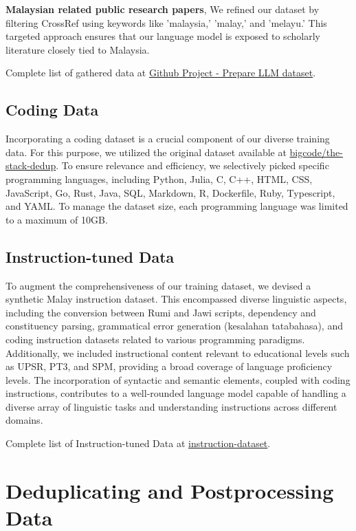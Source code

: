 \documentclass{article}
\begin{document}
\textbf{Malaysian related public research papers}, We refined our dataset by filtering CrossRef using keywords like 'malaysia,' 'malay,' and 'melayu.' This targeted approach ensures that our language model is exposed to scholarly literature closely tied to Malaysia.

Complete list of gathered data at \href{https://github.com/users/huseinzol05/projects/1}{Github Project - Prepare LLM dataset}.

\subsection{Coding Data}

Incorporating a coding dataset is a crucial component of our diverse training data. For this purpose, we utilized the original dataset available at \href{https://huggingface.co/datasets/bigcode/the-stack-dedup}{bigcode/the-stack-dedup}. To ensure relevance and efficiency, we selectively picked specific programming languages, including Python, Julia, C, C++, HTML, CSS, JavaScript, Go, Rust, Java, SQL, Markdown, R, Dockerfile, Ruby, Typescript, and YAML. To manage the dataset size, each programming language was limited to a maximum of 10GB.

\subsection{Instruction-tuned Data}

To augment the comprehensiveness of our training dataset, we devised a synthetic Malay instruction dataset. This encompassed diverse linguistic aspects, including the conversion between Rumi and Jawi scripts, dependency and constituency parsing, grammatical error generation (kesalahan tatabahasa), and coding instruction datasets related to various programming paradigms. Additionally, we included instructional content relevant to educational levels such as UPSR, PT3, and SPM, providing a broad coverage of language proficiency levels. The incorporation of syntactic and semantic elements, coupled with coding instructions, contributes to a well-rounded language model capable of handling a diverse array of linguistic tasks and understanding instructions across different domains.

Complete list of Instruction-tuned Data at \href{https://github.com/mesolitica/malaya/wiki/MaLLaM-%F0%9F%8C%99-Malaysia-Large-Language-Model#instruction-dataset}{instruction-dataset}.

\section{Deduplicating and Postprocessing Data}
\end{document}
